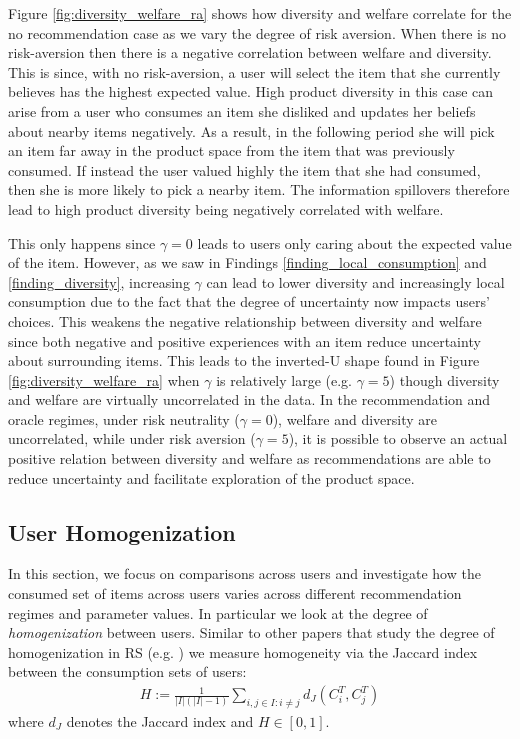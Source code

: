 \documentclass[manuscript]{acmart}
\begin{document}
Figure \ref{fig:diversity_welfare_ra} shows how diversity and welfare correlate for the no recommendation case as we vary the degree of risk aversion. When there is no risk-aversion then there is a negative correlation between welfare and diversity. This is since, with no risk-aversion, a user will select the item that she currently believes has the highest expected value. High product diversity in this case can arise from a user who consumes an item she disliked and updates her beliefs about nearby items negatively. As a result, in the following period she will pick an item far away in the product space from the item that was previously consumed. If instead the user valued highly the item that she had consumed, then she is more likely to pick a nearby item. The information spillovers therefore lead to high product diversity being negatively correlated with welfare.
\par
This only happens since $\gamma = 0$ leads to users only caring about the expected value of the item. However, as we saw in Findings \ref{finding_local_consumption} and \ref{finding_diversity}, increasing $\gamma$ can lead to lower diversity and increasingly local consumption due to the fact that the degree of uncertainty now impacts users' choices. This weakens the negative relationship between diversity and welfare since both negative and positive experiences with an item reduce uncertainty about surrounding items. This leads to the inverted-U shape found in Figure \ref{fig:diversity_welfare_ra} when $\gamma$ is relatively large (e.g. $\gamma = 5$) though diversity and welfare are virtually uncorrelated in the data. In the recommendation and oracle regimes, under risk neutrality ($\gamma=0$), welfare and diversity are uncorrelated, while under risk aversion ($\gamma=5$), it is possible to observe an actual positive relation between diversity and welfare as recommendations are able to reduce uncertainty and facilitate exploration of the product space.

\subsection{User Homogenization}


In this section, we focus on comparisons across users and investigate how the consumed set of items across users varies across different recommendation regimes and parameter values. In particular we look at the degree of \textit{homogenization} between users. Similar to other papers that study the degree of homogenization in RS (e.g. \cite{chaney2018algorithmic}) we measure homogeneity via the Jaccard index between the consumption sets of users:
\begin{align*}
H:=\frac{1}{|I|(|I|-1)}\sum_{i,j \in I: i \ne j}d_J(C_i^T,C_j^T)
\end{align*}
where $d_J$ denotes the Jaccard index and $H \in [0,1]$.
\end{document}
